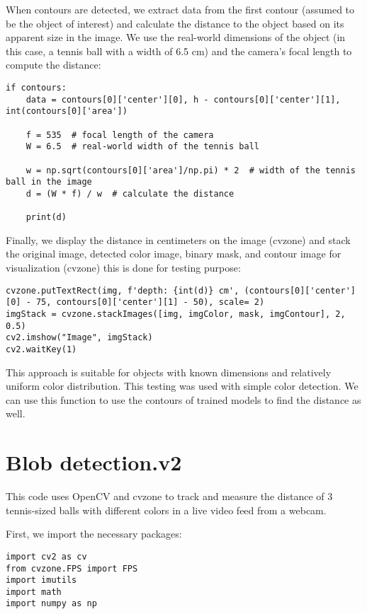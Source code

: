 When contours are detected, we extract data from the first contour (assumed to be the object of interest) and calculate the distance to the object based on its apparent size in the image. We use the real-world dimensions of the object (in this case, a tennis ball with a width of 6.5 cm) and the camera's focal length to compute the distance:

\begin{lstlisting}[language=PythonPlus]
if contours:
    data = contours[0]['center'][0], h - contours[0]['center'][1], int(contours[0]['area'])
    
    f = 535  # focal length of the camera
    W = 6.5  # real-world width of the tennis ball

    w = np.sqrt(contours[0]['area']/np.pi) * 2  # width of the tennis ball in the image
    d = (W * f) / w  # calculate the distance

    print(d)
\end{lstlisting}

Finally, we display the distance in centimeters on the image (cvzone) \cite{CVzoneDoc} and stack the original image, detected color image, binary mask, and contour image for visualization (cvzone) \cite{CVzoneDoc} this is done for testing purpose:

\begin{lstlisting}[language=PythonPlus]
cvzone.putTextRect(img, f'depth: {int(d)} cm', (contours[0]['center'][0] - 75, contours[0]['center'][1] - 50), scale= 2)
imgStack = cvzone.stackImages([img, imgColor, mask, imgContour], 2, 0.5)
cv2.imshow("Image", imgStack)
cv2.waitKey(1)
\end{lstlisting}

This approach is suitable for objects with known dimensions and relatively uniform color distribution. This testing was used with simple color detection. We can use this function to use the contours of trained models to find the distance as well. \newpage

\section{Blob detection.v2}

This code uses OpenCV \cite{OpenCVDoc} and cvzone \cite{CVzoneDoc} to track and measure the distance of 3 tennis-sized balls with different colors in a live video feed from a webcam.

First, we import the necessary packages:
\begin{lstlisting}[language=PythonPlus]
import cv2 as cv
from cvzone.FPS import FPS
import imutils
import math
import numpy as np
\end{lstlisting}

